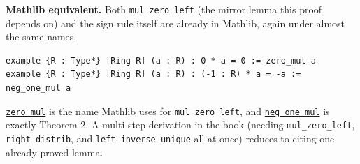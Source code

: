 \textbf{Mathlib equivalent.} Both \texttt{mul\_\allowbreak{}zero\_\allowbreak{}left} (the mirror lemma this proof depends on) and the sign rule itself are already in Mathlib, again under almost the same names.

\begin{lstlisting}
example {R : Type*} [Ring R] (a : R) : 0 * a = 0 := zero_mul a
example {R : Type*} [Ring R] (a : R) : (-1 : R) * a = -a := neg_one_mul a
\end{lstlisting}

\href{https://loogle.lean-lang.org/?q=zero_mul}{\texttt{zero\_\allowbreak{}mul}} is the name Mathlib uses for \texttt{mul\_\allowbreak{}zero\_\allowbreak{}left}, and \href{https://loogle.lean-lang.org/?q=neg_one_mul}{\texttt{neg\_\allowbreak{}one\_\allowbreak{}mul}} is exactly Theorem 2. A multi-step derivation in the book (needing \texttt{mul\_\allowbreak{}zero\_\allowbreak{}left}, \texttt{right\_\allowbreak{}distrib}, and \texttt{left\_\allowbreak{}inverse\_\allowbreak{}unique} all at once) reduces to citing one already-proved lemma.
